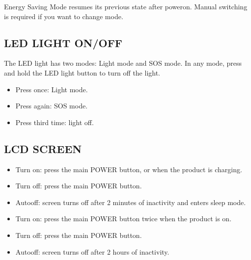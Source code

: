 \documentclass[a4paper,10pt,twoside,openany,english]{sphinxhowto}
\begin{document}
\sphinxAtStartPar
{}

\sphinxAtStartPar
Energy Saving Mode resumes its previous state after power\sphinxhyphen{}on. Manual switching is required if you want to change mode.


\subsection{LED LIGHT ON/OFF}
\label{\detokenize{index:led-light-on-off}}
\sphinxAtStartPar
The LED light has two modes: Light mode and SOS mode.
In any mode, press and hold the LED light button to turn off the light.
\begin{itemize}
\item {} 
\sphinxAtStartPar
Press once: Light mode.

\item {} 
\sphinxAtStartPar
Press again: SOS mode.

\item {} 
\sphinxAtStartPar
Press third time: light off.

\end{itemize}


\subsection{LCD SCREEN}
\label{\detokenize{index:lcd-screen}}
\sphinxAtStartPar
{}
\begin{itemize}
\item {} 
\sphinxAtStartPar
Turn on: press the main POWER button, or when the product is charging.

\item {} 
\sphinxAtStartPar
Turn off: press the main POWER button.

\item {} 
\sphinxAtStartPar
Auto\sphinxhyphen{}off: screen turns off after 2 minutes of inactivity and enters sleep mode.

\end{itemize}

\sphinxAtStartPar
{}
\begin{itemize}
\item {} 
\sphinxAtStartPar
Turn on: press the main POWER button twice when the product is on.

\item {} 
\sphinxAtStartPar
Turn off: press the main POWER button.

\item {} 
\sphinxAtStartPar
Auto\sphinxhyphen{}off: screen turns off after 2 hours of inactivity.

\end{itemize}
\end{document}
